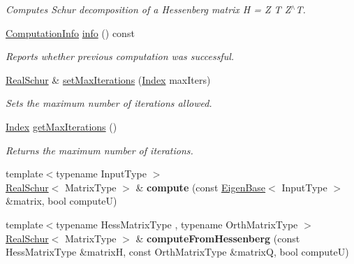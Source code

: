 \begin{DoxyCompactItemize}
\begin{DoxyCompactList}\small\item\em Computes Schur decomposition of a Hessenberg matrix H = Z T Z$^\wedge$T. \end{DoxyCompactList}\item 
\hyperlink{group__enums_ga85fad7b87587764e5cf6b513a9e0ee5e}{Computation\+Info} \hyperlink{group___eigenvalues___module_a386fd2b1a3a8401eca7183ac074deec8}{info} () const
\begin{DoxyCompactList}\small\item\em Reports whether previous computation was successful. \end{DoxyCompactList}\item 
\hyperlink{group___eigenvalues___module_class_eigen_1_1_real_schur}{Real\+Schur} \& \hyperlink{group___eigenvalues___module_ad189e8776ee20a12046694f98b354322}{set\+Max\+Iterations} (\hyperlink{group___eigenvalues___module_a8bd4653e2d9569a44ecc95e746422d3f}{Index} max\+Iters)
\begin{DoxyCompactList}\small\item\em Sets the maximum number of iterations allowed. \end{DoxyCompactList}\item 
\mbox{\label{group___eigenvalues___module_a99453076a9617a6af353b5b1f3220c25}} 
\hyperlink{group___eigenvalues___module_a8bd4653e2d9569a44ecc95e746422d3f}{Index} \hyperlink{group___eigenvalues___module_a99453076a9617a6af353b5b1f3220c25}{get\+Max\+Iterations} ()
\begin{DoxyCompactList}\small\item\em Returns the maximum number of iterations. \end{DoxyCompactList}\item 
\mbox{\label{group___eigenvalues___module_af96c3233978aef4869d2001f1368f280}} 
{\footnotesize template$<$typename Input\+Type $>$ }\\\hyperlink{group___eigenvalues___module_class_eigen_1_1_real_schur}{Real\+Schur}$<$ Matrix\+Type $>$ \& {\bfseries compute} (const \hyperlink{group___core___module_struct_eigen_1_1_eigen_base}{Eigen\+Base}$<$ Input\+Type $>$ \&matrix, bool computeU)
\item 
\mbox{\label{group___eigenvalues___module_a201b6132b86462ff9e7b1ad9b0a11354}} 
{\footnotesize template$<$typename Hess\+Matrix\+Type , typename Orth\+Matrix\+Type $>$ }\\\hyperlink{group___eigenvalues___module_class_eigen_1_1_real_schur}{Real\+Schur}$<$ Matrix\+Type $>$ \& {\bfseries compute\+From\+Hessenberg} (const Hess\+Matrix\+Type \&matrixH, const Orth\+Matrix\+Type \&matrixQ, bool computeU)
\end{DoxyCompactItemize}
